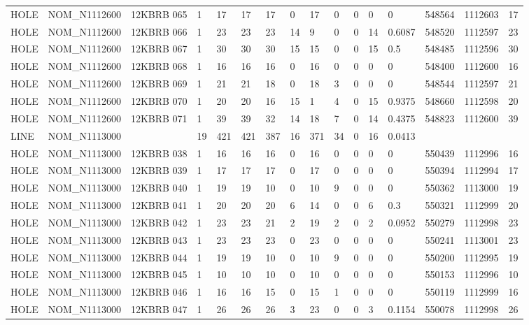 \begin{table}[ht]
\begin{tabular}{llllllllllllllll}
HOLE & NOM\_N1112600 & 12KBRB 065 & 1 & 17 & 17 & 17 & 0 & 17 & 0 & 0 & 0 & 0 & 548564 & 1112603 & 17 \\
HOLE & NOM\_N1112600 & 12KBRB 066 & 1 & 23 & 23 & 23 & 14 & 9 & 0 & 0 & 14 & 0.6087 & 548520 & 1112597 & 23 \\
HOLE & NOM\_N1112600 & 12KBRB 067 & 1 & 30 & 30 & 30 & 15 & 15 & 0 & 0 & 15 & 0.5 & 548485 & 1112596 & 30 \\
HOLE & NOM\_N1112600 & 12KBRB 068 & 1 & 16 & 16 & 16 & 0 & 16 & 0 & 0 & 0 & 0 & 548400 & 1112600 & 16 \\
HOLE & NOM\_N1112600 & 12KBRB 069 & 1 & 21 & 21 & 18 & 0 & 18 & 3 & 0 & 0 & 0 & 548544 & 1112597 & 21 \\
HOLE & NOM\_N1112600 & 12KBRB 070 & 1 & 20 & 20 & 16 & 15 & 1 & 4 & 0 & 15 & 0.9375 & 548660 & 1112598 & 20 \\
HOLE & NOM\_N1112600 & 12KBRB 071 & 1 & 39 & 39 & 32 & 14 & 18 & 7 & 0 & 14 & 0.4375 & 548823 & 1112600 & 39 \\
LINE & NOM\_N1113000 &  & 19 & 421 & 421 & 387 & 16 & 371 & 34 & 0 & 16 & 0.0413 &  &  &  \\
HOLE & NOM\_N1113000 & 12KBRB 038 & 1 & 16 & 16 & 16 & 0 & 16 & 0 & 0 & 0 & 0 & 550439 & 1112996 & 16 \\
HOLE & NOM\_N1113000 & 12KBRB 039 & 1 & 17 & 17 & 17 & 0 & 17 & 0 & 0 & 0 & 0 & 550394 & 1112994 & 17 \\
HOLE & NOM\_N1113000 & 12KBRB 040 & 1 & 19 & 19 & 10 & 0 & 10 & 9 & 0 & 0 & 0 & 550362 & 1113000 & 19 \\
HOLE & NOM\_N1113000 & 12KBRB 041 & 1 & 20 & 20 & 20 & 6 & 14 & 0 & 0 & 6 & 0.3 & 550321 & 1112999 & 20 \\
HOLE & NOM\_N1113000 & 12KBRB 042 & 1 & 23 & 23 & 21 & 2 & 19 & 2 & 0 & 2 & 0.0952 & 550279 & 1112998 & 23 \\
HOLE & NOM\_N1113000 & 12KBRB 043 & 1 & 23 & 23 & 23 & 0 & 23 & 0 & 0 & 0 & 0 & 550241 & 1113001 & 23 \\
HOLE & NOM\_N1113000 & 12KBRB 044 & 1 & 19 & 19 & 10 & 0 & 10 & 9 & 0 & 0 & 0 & 550200 & 1112995 & 19 \\
HOLE & NOM\_N1113000 & 12KBRB 045 & 1 & 10 & 10 & 10 & 0 & 10 & 0 & 0 & 0 & 0 & 550153 & 1112996 & 10 \\
HOLE & NOM\_N1113000 & 12KBRB 046 & 1 & 16 & 16 & 15 & 0 & 15 & 1 & 0 & 0 & 0 & 550119 & 1112999 & 16 \\
HOLE & NOM\_N1113000 & 12KBRB 047 & 1 & 26 & 26 & 26 & 3 & 23 & 0 & 0 & 3 & 0.1154 & 550078 & 1112998 & 26 \\

\end{tabular}
\end{table}
